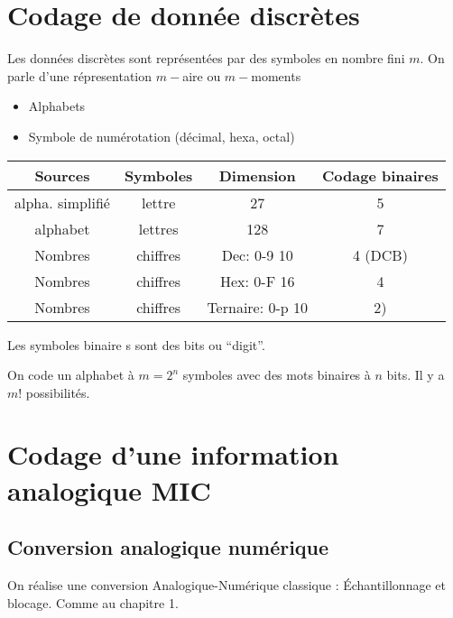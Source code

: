 \documentclass[main.tex]{subfiles}
\begin{document}
\section{Codage de donnée discrètes}
\begin{defin}
Les données discrètes sont représentées par des symboles en nombre fini $m$.
On parle d'une répresentation $m-$aire ou $m-$moments
\end{defin}

\begin{exemple}
  \begin{itemize}
  \item Alphabets
  \item Symbole de numérotation (décimal, hexa, octal)
  \end{itemize}
\end{exemple}
\begin{center}
\begin{tabular}{|c|c|c|c|}
  \hline
  Sources          & Symboles & Dimension        & Codage binaires \\
  \hline
  alpha. simplifié & lettre   & 27               & 5               \\
  alphabet         & lettres  & 128              & 7               \\
  Nombres          & chiffres & Dec: 0-9 10      & 4 (DCB)         \\
  Nombres          & chiffres & Hex: 0-F 16      & 4               \\
  Nombres          & chiffres & Ternaire: 0-p 10 & 2)              \\
  \hline
\end{tabular}
\end{center}

\begin{rem}
Les symboles binaire s sont des bits ou ``digit''.

On code  un alphabet à $m= 2^n$ symboles avec des mots binaires à $n$ bits. Il y a $m!$ possibilités.
\end{rem}

\section{Codage d'une information analogique MIC}
\subsection{Conversion analogique numérique}
On réalise une conversion Analogique-Numérique classique : Échantillonnage et blocage. Comme au chapitre 1.
\end{document}
